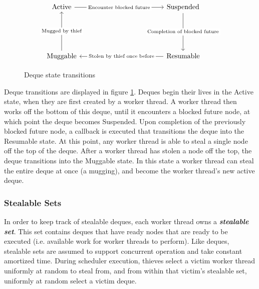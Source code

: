 \documentclass[bsc,frontabs,singlespacing,parskip,deptreport,normalheadings]{infthesis}
\begin{document}
\begin{figure}[ht]
\[\begin{tikzcd}
	{\text{Active}} &&&&& {\text{Suspended}} \\
	\\
	\\
	{\text{Muggable}} &&&&& {\text{Resumable}}
	\arrow["{\text{Encounter blocked future}}"{description}, from=1-1, to=1-6]
	\arrow["{\text{Completion of blocked future}}"{description}, from=1-6, to=4-6]
	\arrow["{\text{Stolen by thief once before}}"{description}, from=4-6, to=4-1]
	\arrow["{\text{Mugged by thief}}"{description}, from=4-1, to=1-1]
\end{tikzcd}\]
\caption{Deque state transitions}
\label{figure:deque_state_transitions}
\end{figure}

Deque transitions are displayed in figure \ref{figure:deque_state_transitions}.
Deques begin their lives in the Active state, when they are first created by a
worker thread. A worker thread then works off the bottom of this deque, until it
encounters a blocked future node, at which point the deque becomes Suspended.
Upon completion of the previously blocked future node, a callback is executed
that transitions the deque into the Resumable state. At this point, any worker
thread is able to steal a single node off the top of the deque. After a worker
thread has stolen a node off the top, the deque transitions into the Muggable
state. In this state a worker thread can steal the entire deque at once (a
mugging), and become the worker thread's new active deque.

\subsubsection*{Stealable Sets}
\label{subsubsection:stealable_sets}

In order to keep track of stealable deques, each worker thread owns a
\textbf{\textit{stealable set}}. This set contains deques that have ready nodes
that are ready to be executed (i.e. available work for worker threads to
perform). Like deques, stealable sets are assumed to support concurrent
operation and take constant amortized time. During scheduler execution, thieves
select a victim worker thread uniformly at random to steal from, and from within
that victim's stealable set, uniformly at random select a victim deque.
\end{document}
